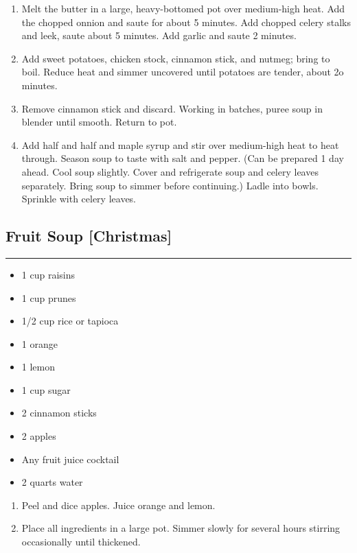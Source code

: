 \documentclass{article}
\begin{document}
\begin{enumerate}
    \item 
        Melt the butter in a large, heavy-bottomed pot over medium-high heat. Add the chopped onnion and saute for about 5 minutes. Add chopped celery stalks and leek, saute about 5 minutes. Add garlic and saute 2 minutes.
    \item
        Add sweet potatoes, chicken stock, cinnamon stick, and nutmeg; bring to boil. Reduce heat and simmer uncovered until potatoes are tender, about 2o minutes.
    \item
        Remove cinnamon stick and discard. Working in batches, puree soup in blender until smooth. Return to pot.
    \item 
        Add half and half and maple syrup and stir over medium-high heat to heat through. Season soup to taste with salt and pepper. (Can be prepared 1 day ahead. Cool soup slightly. Cover and refrigerate soup and celery leaves separately. Bring soup to simmer before continuing.) Ladle into bowls. Sprinkle with celery leaves.
\end{enumerate}
\newpage

\subsection{Fruit Soup [Christmas]} 
\noindent\rule[0.5ex]{\linewidth}{1pt}

\begin{framed}
    \begin{itemize}
        \item 1 cup raisins 
        \item 1 cup prunes 
        \item 1/2 cup rice or tapioca 
        \item 1 orange 
        \item 1 lemon 
        \item 1 cup sugar 
        \item 2 cinnamon sticks 
        \item 2 apples
        \item Any fruit juice cocktail 
        \item 2 quarts water 
    \end{itemize}
\end{framed}

\begin{enumerate}
    \item 
        Peel and dice apples. Juice orange and lemon.
    \item 
        Place all ingredients in a large pot. Simmer slowly for several hours stirring occasionally until thickened.
\end{enumerate}
\newpage
\end{document}
